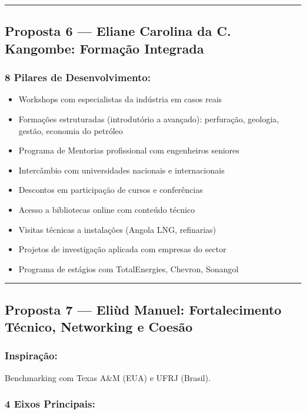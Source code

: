 \documentclass[12pt,a4paper]{article}
\begin{document}
\textcolor{spe-secondary}{\hspace{0.5cm}\rule{0.4\linewidth}{0.8pt}}

\subsection{Proposta 6 — Eliane Carolina da C. Kangombe: Formação Integrada}

\subsubsection*{8 Pilares de Desenvolvimento:}

\begin{itemize}[itemsep=0.15cm]
    \item Workshops com especialistas da indústria em casos reais
    \item Formações estruturadas (introdutório a avançado): perfuração, geologia, gestão, economia do petróleo
    \item Programa de Mentorias profissional com engenheiros seniores
    \item Intercâmbio com universidades nacionais e internacionais
    \item Descontos em participação de cursos e conferências
    \item Acesso a bibliotecas online com conteúdo técnico
    \item Visitas técnicas a instalações (Angola LNG, refinarias)
    \item Projetos de investigação aplicada com empresas do sector
    \item Programa de estágios com TotalEnergies, Chevron, Sonangol
\end{itemize}

\textcolor{spe-secondary}{\hspace{0.5cm}\rule{0.4\linewidth}{0.8pt}}

\subsection{Proposta 7 — Eliùd Manuel: Fortalecimento Técnico, Networking e Coesão}

\subsubsection*{Inspiração:} Benchmarking com Texas A\&M (EUA) e UFRJ (Brasil).

\subsubsection*{4 Eixos Principais:}
\end{document}
